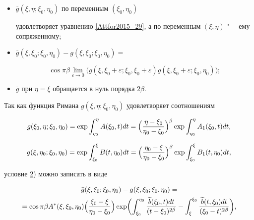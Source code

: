 \begin{itemize}

\item[1)] $\bar{g}(\xi,\eta;\xi_0,\eta_0)$ по переменным $(\xi_0,\eta_0)$ 

удовлетворяет уравнению \eqref{Attfor2015_29}, а по переменным $(\xi,\eta)$ "--- ему сопряженному\hypertarget{at:usl2}{;} 



\item[2)] $\bar{g}(\xi,\xi_0;\xi_0,\eta_0)-g(\xi,\xi_0;\xi_0,\eta_0)=$

$$\cos \pi\beta \lim\limits_{\varepsilon\rightarrow 0}

\bigl(g(\xi,\xi_0+\varepsilon;\xi_0,\xi_0+\varepsilon)g(\xi,\xi_0+\varepsilon;\xi_0,\eta_0)\bigr);$$



\item[3)] $\bar{g}$ при $\eta=\xi$ обращается в нуль порядка $2\beta$.



\end{itemize}



Так как функция Римана $g(\xi,\eta;\xi_0,\eta_0)$ удовлетворяет соотношениям

$$

g(\xi_0,\eta;\xi_0,\eta_0)=\exp \int _{\eta_0}^\eta A(\xi_0,t)dt=

\Bigl(\frac{\eta-\xi_0}{\eta_0-\xi_0}\Bigr)^\beta \exp

 \int _{\eta_0}^\eta A_1(\xi_0,t)dt,

$$

$$

g(\xi,\eta_0;\xi_0,\eta_0)=\exp \int _{\xi_0}^\xi B(t,\eta_0)dt=

\Bigl(\frac{\eta_0-\xi}{\eta_0-\xi_0}\Bigr)^\beta \exp

 \int _{\xi_0}^\xi B_1(t,\eta_0)dt,

$$

условие \hyperlink{at:usl2}{2}) можно записать в виде

\begin{multline}

\bar{g}(\xi,\xi_0;\xi_0,\eta_0)-g(\xi,\xi_0;\xi_0,\eta_0)=

\\

=\cos \pi\beta A^*(\xi,\xi_0,\eta_0)\Bigl(\frac{\xi_0-\xi}{\eta_0-\xi_0}\Bigr)

\exp\biggl(

 \int _{\xi_0}^{\eta_0} \frac{\widetilde{b}(\xi_0,t)dt}{(t-\xi_0)^{2\beta}} -

 \int _{\xi}^{\xi_0}    \frac{\widetilde{b}(t,\xi_0)dt}{(\xi_0-t)^{2\beta}}

\biggr),

\end{multline}

